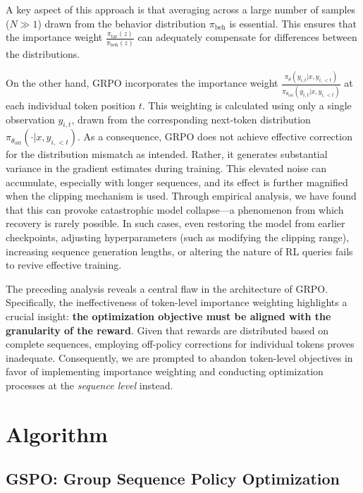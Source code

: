 A key aspect of this approach is that averaging across a large number of samples ($N \gg 1$) drawn from the behavior distribution $\pi_\text{beh}$ is essential. This ensures that the importance weight $\frac{ \pi_\text{tar} (z) }{ \pi_\text{beh} (z)}$ can adequately compensate for differences between the distributions.

On the other hand, GRPO incorporates the importance weight $\frac{ \pi_{\theta} (y_{i,t} | x, y_{i,<t}) }{ \pi_{\theta_\text{old}} (y_{i,t} | x,y_{i,<t})}$ at each individual token position $t$. This weighting is calculated using only a single observation $y_{i,t}$, drawn from the corresponding next-token distribution $\pi_{\theta_\text{old}}( \cdot | x, y_{i, <t})$. As a consequence, GRPO does not achieve effective correction for the distribution mismatch as intended. Rather, it generates substantial variance in the gradient estimates during training. This elevated noise can accumulate, especially with longer sequences, and its effect is further magnified when the clipping mechanism is used. Through empirical analysis, we have found that this can provoke catastrophic model collapse—a phenomenon from which recovery is rarely possible. In such cases, even restoring the model from earlier checkpoints, adjusting hyperparameters (such as modifying the clipping range), increasing sequence generation lengths, or altering the nature of RL queries fails to revive effective training.

The preceding analysis reveals a central flaw in the architecture of GRPO. Specifically, the ineffectiveness of token-level importance weighting highlights a crucial insight: \textbf{the optimization objective must be aligned with the granularity of the reward}. Given that rewards are distributed based on complete sequences, employing off-policy corrections for individual tokens proves inadequate. Consequently, we are prompted to abandon token-level objectives in favor of implementing importance weighting and conducting optimization processes at the \textit{sequence level} instead.

\section{Algorithm}

\subsection{GSPO: Group Sequence Policy Optimization}

